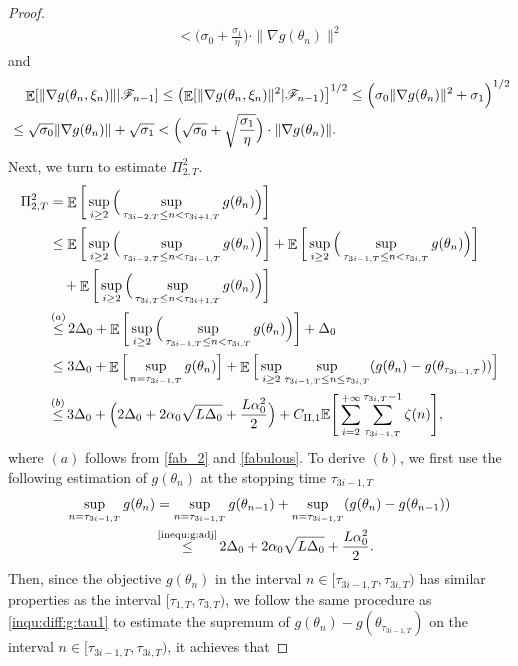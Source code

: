 \documentclass[standalone]{article}
\newcommand{\E}{\mathbb{E}}
\DeclareMathOperator{\Expect}{\mathbb{E}}
\begin{document}
\begin{proof}
\begin{align}
     < \Big({\sigma_{0}}+{\frac{\sigma_{1}}{{\eta}}}\Big)\cdot\|\nabla g(\theta_{n})\|^{2}
\end{align}
and
\begin{align}\label{asddsa}
    &\quad \Expect[\|\nabla g(\theta_{n},\xi_{n})\||\mathscr{F}_{n-1}]  \leq \left(\Expect[\|\nabla g(\theta_{n},\xi_{n})\|^2|\mathscr{F}_{n-1}) \right]^{1/2} \leq \Big({\sigma_{0}}\|\nabla g(\theta_{n})\|^{2}+{\sigma_{1}}\Big)^{1/2} \notag \\
    &\le \sqrt{\sigma_{0}}\|\nabla g(\theta_{n})\|+\sqrt{\sigma_{1}} <\Big(\sqrt{\sigma_{0}}+\sqrt{\frac{\sigma_{1}}{{\eta}}}\Big)\cdot\|\nabla g(\theta_{n})\|.
\end{align}
Next, we turn to estimate $\Pi_{2,T}^2$.
\begin{align}\label{qaswert}
   \Pi_{2,T}^2&={\Expect\bigg[\sup_{i\ge 2}\Big(\sup_{\tau_{3i-2,T}\le n<\tau_{3i+1,T}}g(\theta_n)\Big)\bigg]}\notag\\&\le \Expect\bigg[\sup_{i\ge 2}\Big(\sup_{\tau_{3i-2,T}\le n<\tau_{3i-1,T}}g(\theta_n)\Big)\bigg]+\Expect\bigg[\sup_{i\ge 2}\Big(\sup_{\tau_{3i-1,T}\le n<\tau_{3i,T}}g(\theta_n)\Big)\bigg]\notag\\&\quad +\Expect\bigg[\sup_{i\ge 2}\Big(\sup_{\tau_{3i,T}\le n<\tau_{3i+1,T}}g(\theta_n)\Big)\bigg]\notag\\&\mathop{\le}^{(a)} 2\Delta_{0}+\Expect\bigg[\sup_{i\ge 2}\Big(\sup_{\tau_{3i-1,T}\le n<\tau_{3i,T}}g(\theta_n)\Big)\bigg]+\Delta_{0}\notag\\&\le 3\Delta_{0}+\Expect\Big[\sup_{n=\tau_{3i-1,T}}{g}(\theta_{n})\Big]+\Expect\Big[\sup_{i\ge 2}\sup_{\tau_{3i-1,T}\le n\le \tau_{3i,T}}(g(\theta_{n})-g(\theta_{\tau_{3i-1,T}}))\Big]\notag\\&\mathop{\le}^{(b)}3\Delta_{0}+\Big(2\Delta_0+2\alpha_{0}\sqrt{ L\Delta_0}+\frac{ L\alpha_{0}^{2}}{2}\Big) + C_{\Pi,1}\E\Bigg[\sum_{i=2}^{+\infty}\sum_{\tau_{3i-1,T}}^{\tau_{3i,T}-1}\zeta(n)\Bigg],
\end{align}
where $(a)$ follows from \cref{fab_2} and \cref{fabulous}. To derive $(b)$, we first use the following estimation of $g(\theta_n)$ at the stopping time $\tau_{3i-1,T}$  
\begin{align*}
\sup_{n=\tau_{3i-1,T}}{g}(\theta_{n})&=\sup_{n=\tau_{3i-1,T}}{g}(\theta_{n-1})+\sup_{n=\tau_{3i-1,T}}({g}(\theta_{n})-g(\theta_{n-1}))\\&\mathop{\le}^{\text{\cref{inequ:g:adj}}} 2\Delta_{0}+2\alpha_{0}\sqrt{ L\Delta_{0}}+\frac{ L\alpha_{0}^{2}}{2}.
\end{align*}
Then, since the objective $g(\theta_n)$ in the interval $ n \in [\tau_{3i-1,T},\tau_{3i,T})$ has similar properties as the interval $[\tau_{1,T},\tau_{3,T})$, we follow the same procedure as \cref{inqu:diff:g:tau1}  to estimate the supremum of $g(\theta_{n})-g(\theta_{\tau_{3i-1,T}})$ on the interval $ n \in [\tau_{3i-1,T}, \tau_{3i,T})$, it achieves that 

\end{proof}
\end{document}
